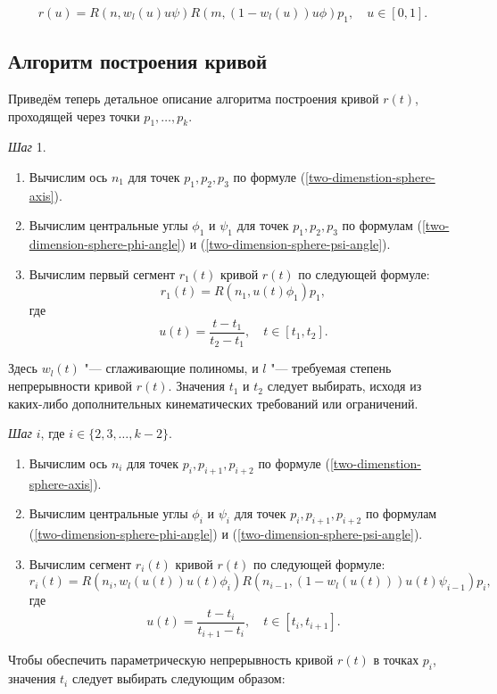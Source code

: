 $$
r(u)=R(n,w_l(u)u\psi)R(m,(1-w_l(u))u\phi)p_1, \quad u \in [0,1].
$$

\subsection*{Алгоритм построения кривой}

Приведём теперь детальное описание алгоритма построения кривой $r(t)$, проходящей через точки $p_1,\dots,p_k$.

\bigskip
\textit{Шаг} 1.

\begin{enumerate}
\item Вычислим ось $n_1$ для точек $p_1, p_2, p_3$ по формуле (\ref{two-dimenstion-sphere-axis}).
\item Вычислим центральные углы $\phi_1$ и $\psi_1$ для точек $p_1, p_2, p_3$ по формулам
(\ref{two-dimension-sphere-phi-angle}) и (\ref{two-dimension-sphere-psi-angle}).
\item Вычислим первый сегмент $r_1(t)$ кривой $r(t)$ по следующей формуле:
$$
r_1(t)=R(n_1,u(t)\phi_1)p_1,
$$
\noindent где
$$
u(t)=\frac{t-t_1}{t_2-t_1}, \quad t \in [t_1,t_2].
$$
\end{enumerate}

Здесь $w_l(t)$ "--- сглаживающие полиномы, и $l$ "--- требуемая степень непрерывности кривой $r(t)$. Значения $t_1$ и
$t_2$ следует выбирать, исходя из каких-либо дополнительных кинематических требований или ограничений.

\bigskip
\textit{Шаг} $i$, где $i \in \{2,3,\dots,k-2\}$.

\begin{enumerate}
\item Вычислим ось $n_i$ для точек $p_i, p_{i+1}, p_{i+2}$ по формуле (\ref{two-dimenstion-sphere-axis}).
\item Вычислим центральные углы $\phi_i$ и $\psi_i$ для точек $p_i, p_{i+1}, p_{i+2}$ по формулам
(\ref{two-dimension-sphere-phi-angle}) и (\ref{two-dimension-sphere-psi-angle}).
\item Вычислим сегмент $r_i(t)$ кривой $r(t)$ по следующей формуле:
$$
r_i(t)=R(n_i,w_l(u(t))u(t)\phi_i)R(n_{i-1},(1-w_l(u(t)))u(t)\psi_{i-1})p_i,
$$
\noindent где
$$
u(t)=\frac{t-t_i}{t_{i+1}-t_i}, \quad t \in [t_i,t_{i+1}].
$$
\end{enumerate}

Чтобы обеспечить параметрическую непрерывность кривой $r(t)$ в точках $p_i$, значения $t_i$ следует выбирать следующим
образом:

